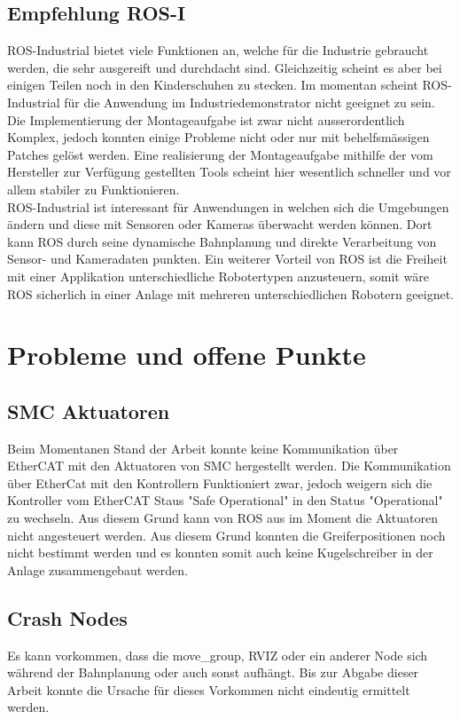\subsection{Empfehlung ROS-I}
ROS-Industrial bietet viele Funktionen an, welche für die Industrie gebraucht werden, die sehr ausgereift und durchdacht sind. Gleichzeitig scheint es aber bei einigen Teilen noch in den Kinderschuhen zu stecken. Im momentan scheint ROS-Industrial für die Anwendung im Industriedemonstrator nicht geeignet zu sein. Die Implementierung der Montageaufgabe ist zwar nicht ausserordentlich Komplex, jedoch konnten einige Probleme nicht oder nur mit behelfsmässigen Patches gelöst werden. Eine realisierung der Montageaufgabe mithilfe der vom Hersteller zur Verfügung gestellten Tools scheint hier wesentlich schneller und vor allem stabiler zu Funktionieren.\\

ROS-Industrial ist interessant für Anwendungen in welchen sich die Umgebungen ändern und diese mit Sensoren oder Kameras überwacht werden können. Dort kann ROS durch seine dynamische Bahnplanung und direkte Verarbeitung von Sensor- und Kameradaten punkten. Ein weiterer Vorteil von ROS ist die Freiheit mit einer Applikation unterschiedliche Robotertypen anzusteuern, somit wäre ROS sicherlich in einer Anlage mit mehreren unterschiedlichen Robotern geeignet.

\section{Probleme und offene Punkte}
\subsection{SMC Aktuatoren}
Beim Momentanen Stand der Arbeit konnte keine Kommunikation über EtherCAT mit den Aktuatoren von SMC hergestellt werden. Die Kommunikation über EtherCat mit den Kontrollern Funktioniert zwar, jedoch weigern sich die Kontroller vom EtherCAT Staus "Safe Operational" in den Status "Operational" zu wechseln. Aus diesem Grund kann von ROS aus im Moment die Aktuatoren nicht angesteuert werden. Aus diesem Grund konnten die Greiferpositionen noch nicht bestimmt werden und es konnten somit auch keine Kugelschreiber in der Anlage zusammengebaut werden.
 
\subsection{Crash Nodes}
Es kann vorkommen, dass die move\_group, RVIZ oder ein anderer Node sich während der Bahnplanung oder auch sonst \textgravedbl aufhängt\textacutedbl. Bis zur Abgabe dieser Arbeit konnte die Ursache für dieses Vorkommen nicht eindeutig ermittelt werden.

